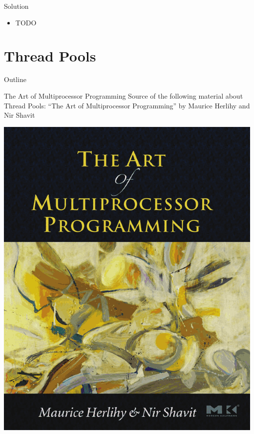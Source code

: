 \begin{frame}{Solution}
  \begin{itemize}
  \item TODO
  \end{itemize}
\end{frame}


\section{Thread Pools}

\begin{frame}{Outline}
  \tableofcontents[current]
\end{frame}

\begin{frame}{The Art of Multiprocessor Programming}
  Source of the following material about Thread Pools: ``The Art of
  Multiprocessor Programming'' by Maurice Herlihy and Nir Shavit


  \begin{center}
    \includegraphics[scale=0.28]{figures/book-herlihy}
  \end{center}
\end{frame}

